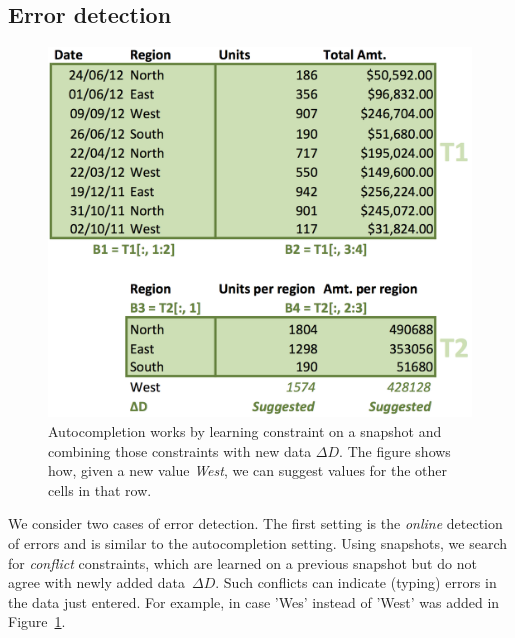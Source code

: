 \subsection{Error detection}
\begin{figure}[t]
\begin{center}
    \includegraphics[width=0.65\linewidth]{figures/Learning.png}
  \end{center}
  \caption{Autocompletion works by learning constraint on a snapshot and combining those constraints with new data $\Delta D$.
  The figure shows how, given a new value \textit{West}, we can suggest values for the other cells in that row.}
  \label{fig:autocompletion_example}
\end{figure}

We consider two cases of error detection.
The first setting is the \textit{online} detection of errors and is similar to the autocompletion setting.
Using snapshots, we search for \textit{conflict} constraints, which are learned on a previous snapshot but do not agree with newly added data~$\Delta D$.
Such conflicts can indicate (typing) errors in the data just entered. For example, in case 'Wes' instead of 'West' was added in Figure~\ref{fig:autocompletion_example}.


